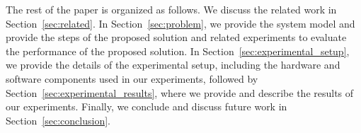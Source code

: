 


 The rest of the paper is organized as follows. We discuss the related work in Section~\ref{sec:related}. In Section~\ref{sec:problem}, we provide the system model and provide the steps of the proposed solution and related experiments to evaluate the performance of the proposed solution. 
In Section~\ref{sec:experimental_setup}, we provide the details of the experimental setup, including the hardware and software components used in our experiments, followed by Section~\ref{sec:experimental_results}, where we provide and describe the results of our experiments. Finally, we conclude and discuss future work in Section~\ref{sec:conclusion}.






